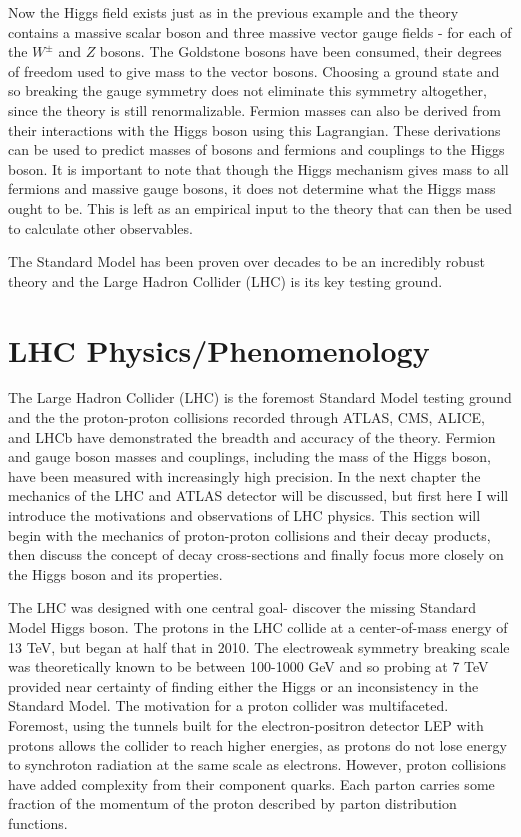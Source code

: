 Now the Higgs field exists just as in the previous example and the theory contains a massive scalar boson and three massive vector gauge fields - for each of the $W^\pm$ and $Z$ bosons. The Goldstone bosons have been consumed, their degrees of freedom used to give mass to the vector bosons. Choosing a ground state and so breaking the gauge symmetry does not eliminate this symmetry altogether, since the theory is still renormalizable. Fermion masses can also be derived from their interactions with the Higgs boson using this Lagrangian. These derivations can be used to predict masses of bosons and fermions and couplings to the Higgs boson. It is important to note that though the Higgs mechanism gives mass to all fermions and massive gauge bosons, it does not determine what the Higgs mass ought to be. This is left as an empirical input to the theory that can then be used to calculate other observables. 

The Standard Model has been proven over decades to be an incredibly robust theory and the Large Hadron Collider (LHC) is its key testing ground. 

\section{LHC Physics/Phenomenology}
The Large Hadron Collider (LHC) is the foremost Standard Model testing ground and the the proton-proton collisions recorded through ATLAS, CMS, ALICE, and LHCb have demonstrated the breadth and accuracy of the theory. Fermion and gauge boson masses and couplings, including the mass of the Higgs boson, have been measured with increasingly high precision. In the next chapter the mechanics of the LHC and ATLAS detector will be discussed, but first here I will introduce the motivations and observations of LHC physics. This section will begin with the mechanics of proton-proton collisions and their decay products, then discuss the concept of decay cross-sections and finally focus more closely on the Higgs boson and its properties.

The LHC was designed with one central goal- discover the missing Standard Model Higgs boson. The protons in the LHC collide at a center-of-mass energy of 13 TeV, but began at half that in 2010. The electroweak symmetry breaking scale was theoretically known to be between 100-1000 GeV and so probing at 7 TeV provided near certainty of finding either the Higgs or an inconsistency in the Standard Model. The motivation for a proton collider was multifaceted. Foremost, using the tunnels built for the electron-positron detector LEP with protons allows the collider to reach higher energies, as protons do not lose energy to synchroton radiation at the same scale as electrons. However, proton collisions have added complexity from their component quarks. Each parton carries some fraction of the momentum of the proton described by parton distribution functions. 

